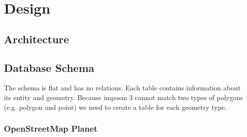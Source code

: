 \chapter{Design}\label{design}


\section{Architecture}\label{architecture}



\section{Database Schema}\label{database-schema}


The schema is flat and has no relations. Each table contains
information about its entity and geometry. Because imposm 3
cannot match two types of polygons (e.g. polygon and point) we need
to create a table for each geometry type.

\subsection{OpenStreetMap Planet}

